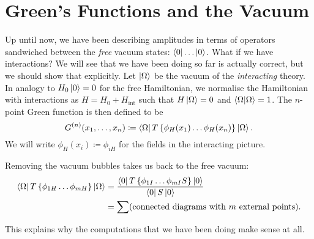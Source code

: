 \section{Green's Functions and the Vacuum}%
\label{sec:green_s_functions_and_the_vacuum}

Up until now, we have been describing amplitudes in terms of operators sandwiched between the \emph{free} vacuum states: $\bra{0} \dots \ket{0}$.
What if we have interactions? We will see that we have been doing so far is actually correct, but we should show that explicitly.
Let $\ket{\Omega}$ be the vacuum of the \emph{interacting} theory.
In analogy to $H_0 \ket{0} = 0$ for the free Hamiltonian, we normalise the Hamiltonian with interactions as $H = H_0 + H_{\text{int}}$ such that $H \ket{\Omega}= 0$ and $\bra{\Omega}\ket{\Omega} = 1$.
The $n$-point Green function is then defined to be
\begin{equation}
  G^{(n)} (x_1, \dots, x_n) \coloneqq \bra{\Omega} T \left\{ \phi_H (x_1) \dots \phi_H(x_n) \right\} \ket{\Omega}.
\end{equation}
We will write $\phi_H(x_i) \coloneqq \phi_{iH}$ for the fields in the interacting picture.
\begin{claim}
  Removing the vacuum bubbles takes us back to the free vacuum:
  \begin{align}
    \bra{\Omega} T \left\{ \phi_{1H} \dots \phi_{m H} \right\} \ket{\Omega} &=
    \frac{\bra{0} T \left\{ \phi_{1I} \dots \phi_{mI}S \right\}\ket{0}}{\bra{0}S \ket{0}} \\
									    &= \sum (\text{connected diagrams with $m$ external points}).
  \end{align}
\end{claim}
\begin{leftbar}
  \begin{remark}
    This explains why the computations that we have been doing make sense at all.
  \end{remark}
\end{leftbar}
